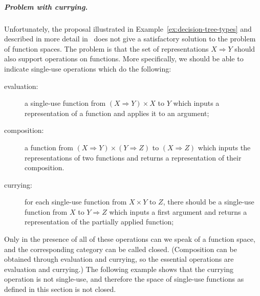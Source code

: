 \documentclass[10pt,a4paper]{amsart}
\numberwithin{equation}{section}
\theoremstyle{plain}
\begin{document}
\subparagraph{Problem with currying.}
Unfortunately, the proposal illustrated in Example~\ref{ex:decision-tree-types} and described in more detail in~\cite{stefanski-phd}  does not give a satisfactory solution to the problem of function spaces. The problem is that the set of representations $X \Rightarrow Y$ should  also support operations on functions. More specifically, we should be able to indicate single-use operations which do the following:
\begin{description}
    \item[evaluation:] a single-use function from $(X \Rightarrow Y) \times X$ to $Y$ which inputs a representation of a function and applies it to an argument;
    \item[composition:] a function from $(X \Rightarrow Y) \times (Y \Rightarrow Z)$ to $(X \Rightarrow Z)$ which inputs the representations of two functions and returns a representation of their composition.
    \item[currying:] for each single-use function from  $ X \times Y $ to $Z$, there should be a single-use function from $X$ to $Y \Rightarrow Z$ which inputs a first argument and returns a representation of the  partially applied function;
\end{description}
Only in the presence of all of these operations can we speak of a function space, and the corresponding category can be called closed. (Composition can be obtained through evaluation and currying, so the essential operations are evaluation and currying.) The following example shows that the currying operation is not single-use, and therefore the space of single-use functions as defined in this section is not closed.
\end{document}

